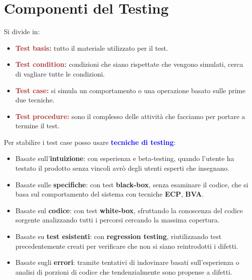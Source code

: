\section{Componenti del Testing}
Si divide in:
\begin{itemize}
    \item \textbf{\textcolor{brown}{Test basis:}} tutto il materiale utilizzato per il test.
    \item \textbf{\textcolor{brown}{Test condition:}} condizioni che siano rispettate che vengono simulati, cerca di vagliare tutte le condizioni.
    \item \textbf{\textcolor{brown}{Test case:}} si simula un comportamento o una operazione basato sulle prime due tecniche.
    \item \textbf{\textcolor{brown}{Test procedure:}} sono il complesso delle attività che facciamo per portare a termine il test.
\end{itemize}

Per stabilire i test case posso usare \textbf{\textcolor{blue}{tecniche di testing}}:
\begin{itemize}
    \item Basate sull'\textbf{intuizione}: con esperienza e beta-testing, quando l'utente ha testato il prodotto senza vincoli avrò degli utenti esperti che insegnano.
    \item Basate sulle \textbf{specifiche}: con test \textbf{black-box}, senza esaminare il codice, che si basa sul comportamento del sistema con tecniche \textbf{ECP}, \textbf{BVA}.
    \item Basate sul \textbf{codice}: con test \textbf{white-box}, sfruttando la conoscenza del codice sorgente analizzando tutti i percorsi cercando la massima copertura.
    \item Basate su \textbf{test esistenti}: con \textbf{regression testing}, riutilizzando test precedentemente creati per verificare che non si siano reintrodotti i difetti.
    \item Basate sugli \textbf{errori}: tramite tentativi di indovinare basati sull'esperienza o analisi di porzioni di codice che tendenzialmente sono propense a difetti.
\end{itemize}

